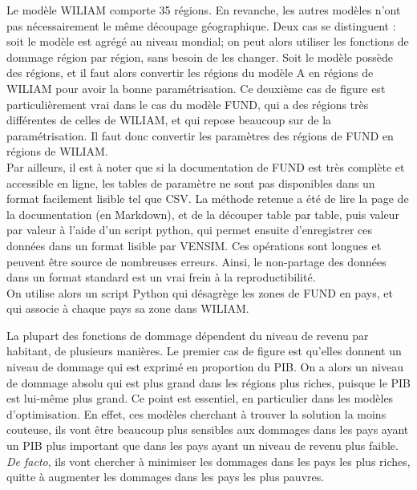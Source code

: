 \begin{methodbox}

    Le modèle WILIAM comporte 35 régions. En revanche, les autres modèles n'ont pas nécessairement le même découpage géographique. Deux cas se distinguent : soit le modèle est agrégé au niveau mondial; on peut alors utiliser les fonctions de dommage région par région, sans besoin de les changer. Soit le modèle possède des régions, et il faut alors convertir les régions du modèle A en régions de WILIAM pour avoir la bonne paramétrisation. Ce deuxième cas de figure est particulièrement vrai dans le cas du modèle FUND, qui a des régions très différentes de celles de WILIAM, et qui repose beaucoup sur de la paramétrisation. Il faut donc convertir les paramètres des régions de FUND en régions de WILIAM. \\

    Par ailleurs, il est à noter que si la documentation de FUND est très complète et accessible en ligne, les tables de paramètre ne sont pas disponibles dans un format facilement lisible tel que CSV. La méthode retenue a été de lire la page de la documentation (en Markdown), et de la découper table par table, puis valeur par valeur à l'aide d'un script python, qui permet ensuite d'enregistrer ces données dans un format lisible par VENSIM. Ces opérations sont longues et peuvent être source de nombreuses erreurs. Ainsi, le non-partage des données dans un format standard est un vrai frein à la reproductibilité. \\
    
    On utilise alors un script Python qui désagrège les zones de FUND en pays, et qui associe à chaque pays sa zone dans WILIAM. 
    
\end{methodbox}

La plupart des fonctions de dommage dépendent du niveau de revenu par habitant, de plusieurs manières. Le premier cas de figure est qu'elles donnent un niveau de dommage qui est exprimé en proportion du PIB. On a alors un niveau de dommage absolu qui est plus grand dans les régions plus riches, puisque le PIB est lui-même plus grand. Ce point est essentiel, en particulier dans les modèles d'optimisation. En effet, ces modèles cherchant à trouver la solution la moins couteuse, ils vont être beaucoup plus sensibles aux dommages dans les pays ayant un PIB plus important que dans les pays ayant un niveau de revenu plus faible. \emph{De facto}, ils vont chercher à minimiser les dommages dans les pays les plus riches, quitte à augmenter les dommages dans les pays les plus pauvres. \\

